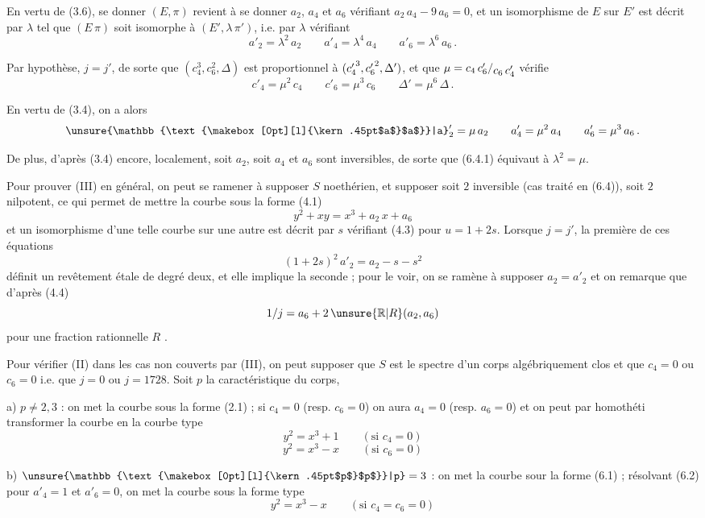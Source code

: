 En vertu de (3.6), se donner $(E,\pi)$ revient à se donner $a_2$, $a_4$ et $a_6$ vérifiant $a_2\,a_4-9\,a_6=0$, et un isomorphisme de $E$ sur $E'$ est décrit par $\lambda$ tel que $(E\,\pi)$ soit isomorphe à $(E',\lambda\,\pi')$, i.e. par $\lambda$ vérifiant
\[
a'_2=\lambda^2\,a_2 \qquad a'_4=\lambda^4\,a_4 \qquad a'_6=\lambda^6\,a_6 \, . \tag*{(6.4.1)}
\]

Par hypothèse, $j=j'$, de sorte que $(c_4^3,c_6^2,\Delta)$ est proportionnel à $(c_4^{\raisebox{-.38ex}{$\scriptstyle\prime$}\,3},c_6^{\raisebox{-.38ex}{$\scriptstyle\prime$}\,2},\Delta')$, et que $\mu=c_4\,c'_6/\raisebox{-.52ex}{$c_6\,c'_4$}$ vérifie
\[
c'_4=\mu^2\,c_4 \qquad c'_6=\mu^3\,c_6 \qquad \Delta'=\mu^6\,\Delta \, . \tag*{(6.4.2)}
\]

En vertu de (3.4), on a alors
\[
{\unsure{\mathbb{\text{\makebox[0pt][l]{\kern.45pt$a$}$a$}}|a}}'_2=\mu\,a_2 \qquad a'_4=\mu^2\,a_4 \qquad a'_6=\mu^3\,a_6 \, .
\]

De plus, d'après (3.4) encore, localement, soit $a_2$, soit $a_4$ et $a_6$ sont inversibles, de sorte que (6.4.1) équivaut à $\lambda^2=\mu$.

Pour prouver (III) en général, on peut se ramener à supposer $S$ noethérien, et supposer soit $2$ inversible (cas traité en (6.4)), soit%
%
\space
$2$ nilpotent, ce qui permet de mettre la courbe sous la forme (4.1)
\[
y^2+xy=x^3+a_2\,x+a_6
\]
et un isomorphisme d'une telle courbe sur une autre est décrit par $s$ vérifiant (4.3) pour $u=1+2s$. Lorsque $j=j'$, la première de ces équations
\[
(1+2s)^2\,a'_2=a_2-s-s^2
\]
définit un revêtement étale de degré deux, et elle implique la seconde ; pour le voir, on se ramène à supposer $a_2=a'_2$ et on remarque que d'après (4.4)
\[
1/j=a_6+2\,\unsure{\mathbb{R}|R}(a_2,a_6)
\]
pour une fraction rationnelle $R$ .

Pour vérifier (II) dans les cas non couverts par (III), on peut supposer que $S$ est le spectre d'un corps algébriquement clos et que $c_4=0$ ou $c_6=0$ \unsure{,|;} i.e. que $j=0$ ou $j=1728$. Soit $p$ la caractéristique du corps,

a) $p\ne 2,3$ : on met la courbe sous la forme (2.1) ; si $c_4=0$ (resp. $c_6=0$) on aura $a_4=0$ (resp. $a_6=0$) et on peut par homothéti transformer la courbe en la courbe type
\[
y^2=x^3+1 \qquad (\text{si }c_4=0) \tag*{(6.5)}
\]
\[
y^2=x^3-x \qquad (\text{si }c_6=0) \tag*{(6.6)}
\]

b) $\unsure{\mathbb{\text{\makebox[0pt][l]{\kern.45pt$p$}$p$}}|p}=3$ : on met la courbe sour la forme (6.1) ; résolvant (6.2) pour $a'_4=1$ et $a'_6=0$, on met la courbe sous la forme type%
%
%
\[
y^2=x^3-x \qquad (\text{si }c_4=c_6=0) \tag*{(6.7)}
\]

